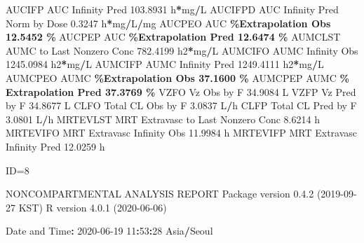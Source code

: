 \documentclass[
  10pt,
]{krantz}
\makeatletter
\newenvironment{Shaded}{\begin{snugshade}}{\end{snugshade}}
\newcommand{\DecValTok}[1]{\textcolor[rgb]{0.00,0.00,0.81}{#1}}
\newcommand{\FloatTok}[1]{\textcolor[rgb]{0.00,0.00,0.81}{#1}}
\newcommand{\NormalTok}[1]{#1}
\newcommand{\OperatorTok}[1]{\textcolor[rgb]{0.81,0.36,0.00}{\textbf{#1}}}
\newcommand{\StringTok}[1]{\textcolor[rgb]{0.31,0.60,0.02}{#1}}
\newenvironment{kframe}{%
\medskip{}
\setlength{\fboxsep}{.8em}
 \def\at@end@of@kframe{}%
 \ifinner\ifhmode%
  \def\at@end@of@kframe{\end{minipage}}%
  \begin{minipage}{\columnwidth}%
 \fi\fi%
 \def\FrameCommand##1{\hskip\@totalleftmargin \hskip-\fboxsep
 \colorbox{shadecolor}{##1}\hskip-\fboxsep
     \hskip-\linewidth \hskip-\@totalleftmargin \hskip\columnwidth}%
 \MakeFramed {\advance\hsize-\width
   \@totalleftmargin\z@ \linewidth\hsize
   \@setminipage}}%
 {\par\unskip\endMakeFramed%
 \at@end@of@kframe}
\renewenvironment{Shaded}{\begin{kframe}}{\end{kframe}}
\makeatother
\begin{document}
\begin{Shaded}
\begin{Highlighting}[]
\NormalTok{AUCIFP     AUC Infinity Pred                             }\FloatTok{103.8931}\NormalTok{ h}\OperatorTok{*}\NormalTok{mg}\OperatorTok{/}\NormalTok{L}
\NormalTok{AUCIFPD    AUC Infinity Pred Norm by Dose                  }\FloatTok{0.3247}\NormalTok{ h}\OperatorTok{*}\NormalTok{mg}\OperatorTok{/}\NormalTok{L}\OperatorTok{/}\NormalTok{mg}
\NormalTok{AUCPEO     AUC }\OperatorTok{\%Extrapolation Obs                         12.5452 \%}
\NormalTok{AUCPEP     AUC }\OperatorTok{\%Extrapolation Pred                        12.6474 \%}
\NormalTok{AUMCLST    AUMC to Last Nonzero Conc                     }\FloatTok{782.4199}\NormalTok{ h2}\OperatorTok{*}\NormalTok{mg}\OperatorTok{/}\NormalTok{L}
\NormalTok{AUMCIFO    AUMC Infinity Obs                            }\FloatTok{1245.0984}\NormalTok{ h2}\OperatorTok{*}\NormalTok{mg}\OperatorTok{/}\NormalTok{L}
\NormalTok{AUMCIFP    AUMC Infinity Pred                           }\FloatTok{1249.4111}\NormalTok{ h2}\OperatorTok{*}\NormalTok{mg}\OperatorTok{/}\NormalTok{L}
\NormalTok{AUMCPEO    AUMC }\OperatorTok{\%Extrapolation Obs                        37.1600 \%}
\NormalTok{AUMCPEP    AUMC }\OperatorTok{\% Extrapolation Pred                      37.3769 \%}
\NormalTok{VZFO       Vz Obs by F                                    }\FloatTok{34.9084}\NormalTok{ L}
\NormalTok{VZFP       Vz Pred by F                                   }\FloatTok{34.8677}\NormalTok{ L}
\NormalTok{CLFO       Total CL Obs by F                               }\FloatTok{3.0837}\NormalTok{ L}\OperatorTok{/}\NormalTok{h}
\NormalTok{CLFP       Total CL Pred by F                              }\FloatTok{3.0801}\NormalTok{ L}\OperatorTok{/}\NormalTok{h}
\NormalTok{MRTEVLST   MRT Extravasc to Last Nonzero Conc              }\FloatTok{8.6214}\NormalTok{ h}
\NormalTok{MRTEVIFO   MRT Extravasc Infinity Obs                     }\FloatTok{11.9984}\NormalTok{ h}
\NormalTok{MRTEVIFP   MRT Extravasc Infinity Pred                    }\FloatTok{12.0259}\NormalTok{ h}





\NormalTok{ID=}\DecValTok{8}

\NormalTok{                        NONCOMPARTMENTAL ANALYSIS REPORT}
\NormalTok{                       Package version }\DecValTok{0}\NormalTok{.}\FloatTok{4.2}\NormalTok{ (}\DecValTok{2019{-}09{-}27}\NormalTok{ KST)}
\NormalTok{                          R version }\DecValTok{4}\NormalTok{.}\FloatTok{0.1}\NormalTok{ (}\DecValTok{2020{-}06{-}06}\NormalTok{)}

\NormalTok{Date and Time}\OperatorTok{:}\StringTok{ }\DecValTok{2020{-}06{-}19} \DecValTok{11}\OperatorTok{:}\DecValTok{53}\OperatorTok{:}\DecValTok{28}\NormalTok{ Asia}\OperatorTok{/}\NormalTok{Seoul}


\end{Highlighting}
\end{Shaded}
\end{document}
